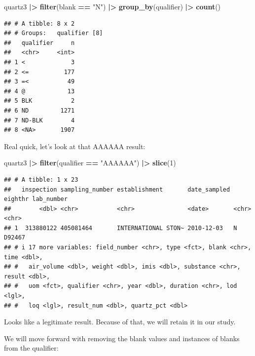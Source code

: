 \documentclass[
]{article}
\newenvironment{Shaded}{\begin{snugshade}}{\end{snugshade}}
\newcommand{\DecValTok}[1]{\textcolor[rgb]{0.00,0.00,0.81}{#1}}
\newcommand{\FunctionTok}[1]{\textcolor[rgb]{0.13,0.29,0.53}{\textbf{#1}}}
\newcommand{\NormalTok}[1]{#1}
\newcommand{\SpecialCharTok}[1]{\textcolor[rgb]{0.81,0.36,0.00}{\textbf{#1}}}
\newcommand{\StringTok}[1]{\textcolor[rgb]{0.31,0.60,0.02}{#1}}
\begin{document}
\begin{Shaded}
\begin{Highlighting}[]
\NormalTok{quartz3 }\SpecialCharTok{|\textgreater{}} 
  \FunctionTok{filter}\NormalTok{(blank }\SpecialCharTok{==} \StringTok{"N"}\NormalTok{) }\SpecialCharTok{|\textgreater{}} 
  \FunctionTok{group\_by}\NormalTok{(qualifier) }\SpecialCharTok{|\textgreater{}} 
  \FunctionTok{count}\NormalTok{()}
\end{Highlighting}
\end{Shaded}

\begin{verbatim}
## # A tibble: 8 x 2
## # Groups:   qualifier [8]
##   qualifier     n
##   <chr>     <int>
## 1 <             3
## 2 <=          177
## 3 =<           49
## 4 @            13
## 5 BLK           2
## 6 ND         1271
## 7 ND-BLK        4
## 8 <NA>       1907
\end{verbatim}

Real quick, let's look at that AAAAAA result:

\begin{Shaded}
\begin{Highlighting}[]
\NormalTok{quartz3 }\SpecialCharTok{|\textgreater{}} 
  \FunctionTok{filter}\NormalTok{(qualifier }\SpecialCharTok{==} \StringTok{"AAAAAA"}\NormalTok{) }\SpecialCharTok{|\textgreater{}} 
  \FunctionTok{slice}\NormalTok{(}\DecValTok{1}\NormalTok{)}
\end{Highlighting}
\end{Shaded}

\begin{verbatim}
## # A tibble: 1 x 23
##   inspection sampling_number establishment       date_sampled eighthr lab_number
##        <dbl> <chr>           <chr>               <date>       <chr>   <chr>     
## 1  313880122 405081464       INTERNATIONAL STON~ 2010-12-03   N       D92467    
## # i 17 more variables: field_number <chr>, type <fct>, blank <chr>, time <dbl>,
## #   air_volume <dbl>, weight <dbl>, imis <dbl>, substance <chr>, result <dbl>,
## #   uom <fct>, qualifier <chr>, year <dbl>, duration <chr>, lod <lgl>,
## #   loq <lgl>, result_num <dbl>, quartz_pct <dbl>
\end{verbatim}

Looks like a legitimate result. Because of that, we will retain it in
our study.

We will move forward with removing the blank values and instances of
blanks from the qualifier:
\end{document}
